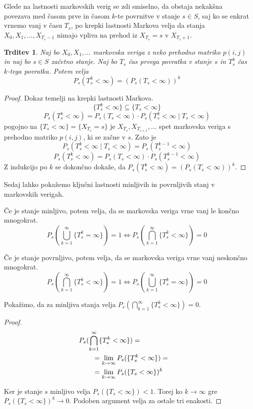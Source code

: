 \documentclass[a4paper,12pt]{article}
\newtheorem{trditev}[izrek]{Trditev}
\begin{document}
Glede na lastnosti markovskih verig se zdi smiselno, da obstaja nekakšna povezava med časom prve in časom 
$k$-te povrnitve v stanje $s \in S$, saj ko se enkrat vrnemo vanj v času $T_s$, po krepki lastnosti Markova velja da stanja $X_0, X_1, ..., X_{T_s-1}$ nimajo 
vpliva na prehod iz $X_{T_s}=s$ v $X_{T_s+1}$.

\begin{trditev}
    Naj bo $X_0, X_1, ...$ markovska veriga z neko prehodno matriko $p(i,j)$ in naj bo $s \in S$ začetno stanje.
    Naj bo $T_s$ čas prvega povratka v stanje $s$ in $T^k_s$ čas $k$-tega povratka. Potem velja
    $$ P_s(T^k_s < \infty) = (P_s(T_s < \infty))^k $$
\end{trditev}

\begin{proof}
    Dokaz temelji na krepki lastnosti Markova.
    $$\{T^k_s< \infty\} \subseteq \{ T_s < \infty\}$$
    $$P_s(T^k_s < \infty) = P_s(T_s < \infty) \cdot P_s(T^k_s < \infty \mid T_s < \infty)$$
    pogojno na $\{T_s < \infty \} = \{X_{T_s} = s\}$ je 
    $X_{T_s}, X_{T_{s+1}}, ...$ spet markovska veriga s prehodno matriko $p(i,j)$, ki se začne v $s$. \newline
    Zato je $$P_s(T^k_s < \infty \mid T_s < \infty) = P_s(T^{k-1}_s < \infty)$$ 
    $$P_s(T^k_s < \infty) = P_s(T_s < \infty) \cdot P_s(T^{k-1}_s < \infty)$$
    Z indukcijo po $k$ se dokončno dokaže, da $ P_s(T^k_s < \infty) = (P_s(T_s < \infty))^k $.
\end{proof}

Sedaj lahko pokažemo ključni lastnosti minljivih in povrnljivih stanj v markovskih verigah.

Če je stanje minljivo, potem velja, da se markovska veriga vrne vanj le končno mnogokrat.
$$P_s(\bigcup_{k=1}^{\infty}\{T^k_s = \infty\}) = 1 \iff P_s(\bigcap_{k = 1}^{\infty}\{T_s^k < \infty\}) = 0$$ 

Če je stanje povrnljivo, potem velja, da se markovska veriga vrne vanj neskončno mnogokrat.
$$P_s(\bigcap_{k=1}^{\infty}\{T^k_s < \infty\}) = 1 \iff P_s(\bigcup_{k=1}^{\infty}\{T^k_s = \infty\}) = 0$$

Pokažimo, da za minljiva stanja velja $P_s(\bigcap_{k = 1}^{\infty}\{T_s^k < \infty\}) = 0$.

\begin{proof}

        \begin{align*}
            \lefteqn{P_s(\bigcap_{k = 1}^{\infty}\{T_s^k < \infty\}) =} \qquad
            \\& = \lim_{k \to \infty}P_s(\{T_s^k < \infty\}) = 
            \\& = \lim_{k \to \infty}P_s(\{T_s < \infty\})^k
        \end{align*}

Ker je stanje $s$ minljivo velja $P_s(\{T_s<\infty\}) < 1$. Torej ko $k \rightarrow \infty$ gre
$P_s(\{T_s < \infty\})^k \rightarrow 0.$ Podoben argument velja za ostale tri enakosti.
\end{proof}



\nocite{RickDurrett}
\nocite{MatjazOmladic_1}
\nocite{MatjazOmladic_2}


\pagebreak





\end{document}
